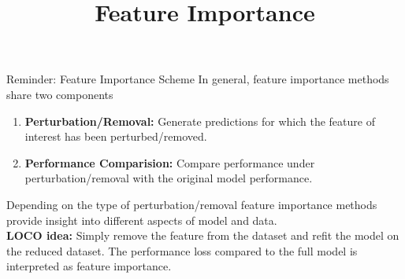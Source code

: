 \documentclass[11pt,compress,t,notes=noshow, xcolor=table]{beamer}
\title{Feature Importance}
\institute{\href{https://compstat-lmu.github.io/lecture_i2ml/}{compstat-lmu.github.io/lecture\_i2ml}}
\date{}
\begin{document}
	
	
	
	
	
	
	
	
	
	

\begin{vbframe}{Reminder: Feature Importance Scheme}
In general, feature importance methods share two components
\lz
\begin{enumerate}
  \item \textbf{Perturbation/Removal:} Generate predictions for which the feature of interest has been perturbed/removed.
  \item \textbf{Performance Comparision:} Compare performance under perturbation/removal with the original model performance.
\end{enumerate}
\lz
Depending on the type of perturbation/removal feature importance methods provide insight into different aspects of model and data.\\
\lz
\textbf{LOCO idea:} Simply remove the feature from the dataset and refit the model on the reduced dataset. The performance loss compared to the full model is interpreted as feature importance.\\

\end{vbframe}
\end{document}

